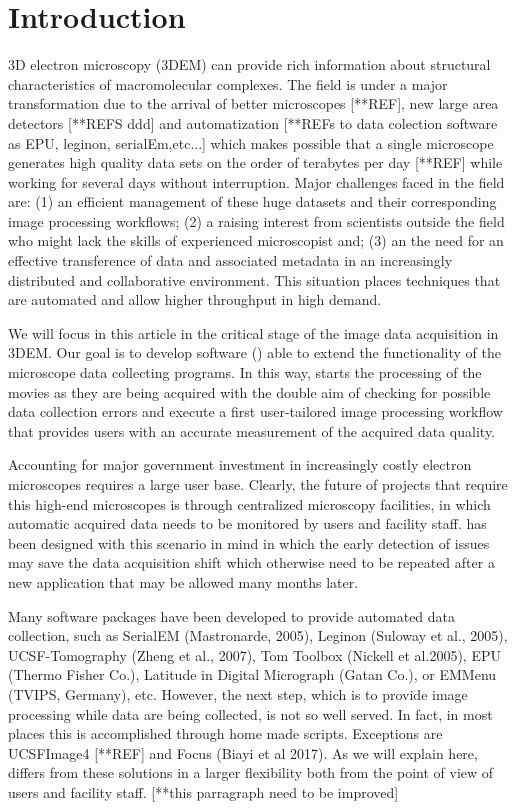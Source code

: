 
\section{Introduction}

3D electron microscopy (3DEM)  can provide rich information about structural characteristics of macromolecular complexes. The field is under a major transformation due to the arrival of better microscopes [**REF], new large area detectors [**REFS ddd] and automatization [**REFs to data colection software as EPU, leginon, serialEm,etc...]  which makes possible that a single microscope generates high quality data sets on the order of terabytes per day [**REF] while working for several days without interruption. Major challenges faced in the field are: (1) an efficient management of these huge datasets and their corresponding image processing workflows; (2) a raising interest from scientists outside the field who might lack the skills of experienced microscopist and; (3) an the need for an effective transference of data and associated metadata in an increasingly distributed and collaborative environment. This situation places techniques that are automated and allow higher throughput in high demand. 

We will focus in this article in the critical stage of the image data acquisition in 3DEM.  Our goal is  to develop software (\scipionbox) able to extend the functionality of the microscope data collecting programs. In this way, \scipionbox starts the processing of the movies as they are being acquired with the double aim of checking for possible data collection errors and execute a first user-tailored image processing workflow that provides users with an accurate measurement of the acquired data quality.

Accounting for major government investment in increasingly costly electron microscopes requires a large user  base. Clearly, the future of projects that require this high-end microscopes is through centralized microscopy facilities, in which automatic acquired data needs to be monitored by users and facility staff. \scipionbox has been designed with this scenario in mind in which the early detection of issues may save the data acquisition shift which otherwise need to be repeated after a new application that may be allowed many months later.

Many software packages have been developed to provide automated data collection, such as SerialEM (Mastronarde, 2005), Leginon (Suloway et al., 2005), UCSF-Tomography (Zheng et al., 2007), Tom Toolbox (Nickell et al.2005), EPU (Thermo Fisher Co.), Latitude in Digital Micrograph (Gatan Co.), or EMMenu
(TVIPS, Germany), etc. However, the next step,  which is to provide image processing while  data are being collected, is not so well served. In fact, in most places this is accomplished through home made scripts. Exceptions are UCSFImage4 [**REF] and Focus (Biayi et al 2017). As we will explain here, \scipionbox differs from these solutions in a larger flexibility both from the point of view of users and facility staff.  [**this parragraph need to be improved]
